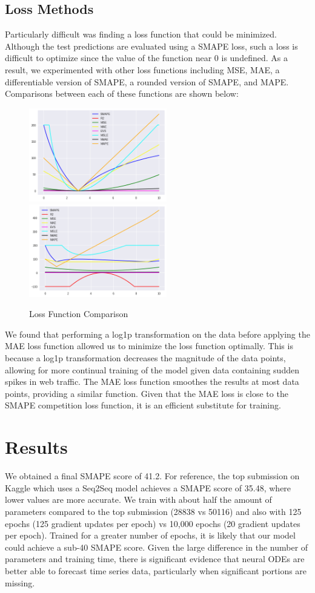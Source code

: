 \documentclass{article} %
\begin{document}
\subsection{Loss Methods}

Particularly difficult was finding a loss function that could be minimized. Although the test predictions are evaluated using a SMAPE loss, such a loss is difficult to optimize since the value of the function near 0 is undefined. As a result, we experimented with other loss functions including MSE, MAE, a differentiable version of SMAPE, a rounded version of SMAPE, and MAPE. Comparisons between each of these functions are shown below:
\begin{figure}[h]
  \centering
  \centering
  \includegraphics[width=6cm]{loss_0.png}
  \includegraphics[width=6cm]{loss_1.png}
  \caption{Loss Function Comparison}
\end{figure}

We found that performing a log1p transformation on the data before applying the MAE loss function allowed us to minimize the loss function optimally. This is because a log1p transformation decreases the magnitude of the data points, allowing for more continual training of the model given data containing sudden spikes in web traffic. The MAE loss function smoothes the results at most data points, providing a similar function. Given that the MAE loss is close to the SMAPE competition loss function, it is an efficient substitute for training.

\section{Results}
We obtained a final SMAPE score of 41.2. For reference, the top submission on Kaggle which uses a Seq2Seq model achieves a SMAPE score of 35.48, where lower values are more accurate. We train with about half the amount of parameters compared to the top submission (28838 vs 50116) and also with 125 epochs (125 gradient updates per epoch) vs 10,000 epochs (20 gradient updates per epoch). 
Trained for a greater number of epochs, it is likely that our model could achieve a sub-40 SMAPE score. Given the large difference in the number of parameters and training time, there is significant evidence that neural ODEs are better able to forecast time series data, particularly when significant portions are missing. 
\end{document}
